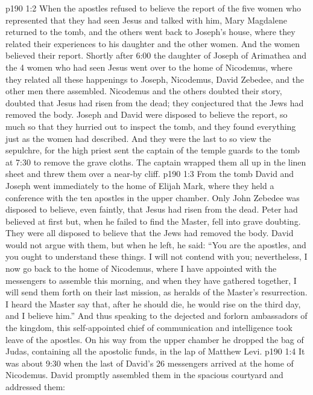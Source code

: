 \vs p190 1:2 When the apostles refused to believe the report of the five women who represented that they had seen Jesus and talked with him, Mary Magdalene returned to the tomb, and the others went back to Joseph’s house, where they related their experiences to his daughter and the other women. And the women believed their report. Shortly after 6:00 the daughter of Joseph of Arimathea and the 4 women who had seen Jesus went over to the home of Nicodemus, where they related all these happenings to Joseph, Nicodemus, David Zebedee, and the other men there assembled. Nicodemus and the others doubted their story, doubted that Jesus had risen from the dead; they conjectured that the Jews had removed the body. Joseph and David were disposed to believe the report, so much so that they hurried out to inspect the tomb, and they found everything just as the women had described. And they were the last to so view the sepulchre, for the high priest sent the captain of the temple guards to the tomb at 7:30 to remove the grave cloths. The captain wrapped them all up in the linen sheet and threw them over a near-by cliff.
\vs p190 1:3 From the tomb David and Joseph went immediately to the home of Elijah Mark, where they held a conference with the ten apostles in the upper chamber. Only John Zebedee was disposed to believe, even faintly, that Jesus had risen from the dead. Peter had believed at first but, when he failed to find the Master, fell into grave doubting. They were all disposed to believe that the Jews had removed the body. David would not argue with them, but when he left, he said: “You are the apostles, and you ought to understand these things. I will not contend with you; nevertheless, I now go back to the home of Nicodemus, where I have appointed with the messengers to assemble this morning, and when they have gathered together, I will send them forth on their last mission, as heralds of the Master’s resurrection. I heard the Master say that, after he should die, he would rise on the third day, and I believe him.” And thus speaking to the dejected and forlorn ambassadors of the kingdom, this self\hyp{}appointed chief of communication and intelligence took leave of the apostles. On his way from the upper chamber he dropped the bag of Judas, containing all the apostolic funds, in the lap of Matthew Levi.
\vs p190 1:4 It was about 9:30 when the last of David’s 26 messengers arrived at the home of Nicodemus. David promptly assembled them in the spacious courtyard and addressed them:
